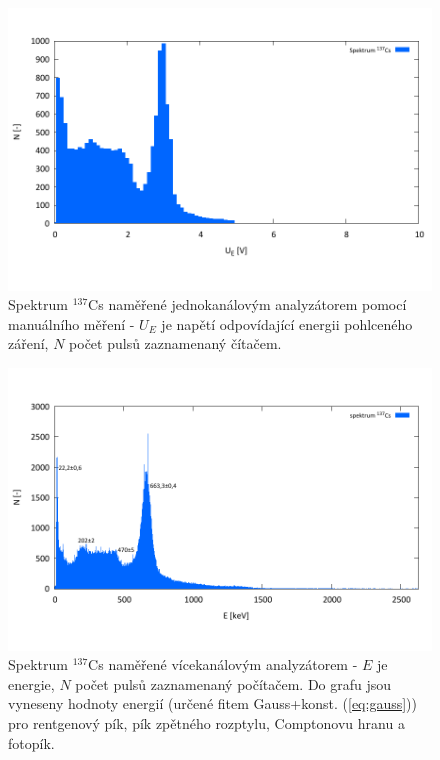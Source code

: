 \documentclass[english]{article}
\begin{document}
	\begin{figure}[h!]
	\begin{center}
	    \vspace*{-1cm}
		\includegraphics[width=\linewidth]{../gnuplot/Cs1.pdf}
	    \vspace*{-2cm}
		\caption{Spektrum $^{137}$Cs naměřené jednokanálovým analyzátorem pomocí manuálního měření - $U_E$ je napětí odpovídající energii pohlceného záření, $N$ počet pulsů zaznamenaný čítačem.}
		\label{fig:g_Cs_jedno}
	\end{center}
	\end{figure}	
	
	\begin{figure}[h!]
	\begin{center}
	    \vspace*{-1cm}
		\includegraphics[width=\linewidth]{../gnuplot/solo/Cs.pdf}
	    \vspace*{-2cm}
		\caption{Spektrum $^{137}$Cs naměřené vícekanálovým analyzátorem - $E$ je energie, $N$ počet pulsů zaznamenaný počítačem. Do grafu jsou vyneseny hodnoty energií (určené fitem Gauss+konst. (\ref{eq:gauss})) pro rentgenový pík, pík zpětného rozptylu, Comptonovu hranu a fotopík.}
		\label{fig:g_Cs_vice}
	\end{center}
	\end{figure}	
	
\end{document}
